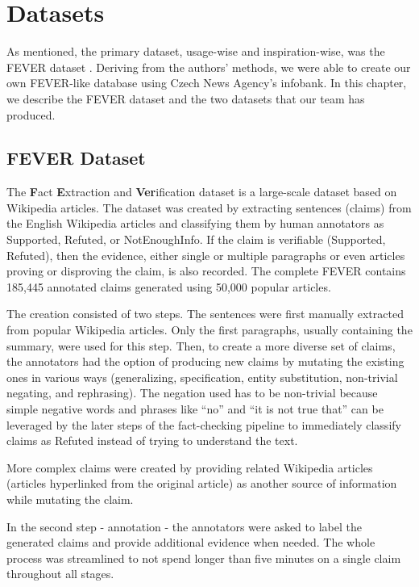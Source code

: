 \chapter{Datasets}
\label{chap:data}

As mentioned, the primary dataset, usage-wise and inspiration-wise, was the FEVER dataset \citep{fever}.
Deriving from the authors' methods, we \citep{ullrich} were able to create our own FEVER-like database using Czech News Agency's infobank. In this chapter, we describe the FEVER dataset and the two datasets that our team has produced.

\section{FEVER Dataset}

The \textbf{F}act \textbf{E}xtraction and \textbf{Ver}ification \citep{fever} dataset is a large-scale dataset based on Wikipedia articles.
The dataset was created by extracting sentences (claims) from the English Wikipedia articles and classifying them by human annotators as Supported, Refuted, or NotEnoughInfo.
If the claim is verifiable (Supported, Refuted), then the evidence, either single or multiple paragraphs or even articles proving or disproving the claim, is also recorded.
The complete FEVER contains 185,445 annotated claims generated using 50,000 popular articles.

The creation consisted of two steps. The sentences were first manually extracted from popular Wikipedia articles.
Only the first paragraphs, usually containing the summary, were used for this step. 
Then, to create a more diverse set of claims, the annotators had the option of producing new claims by mutating the existing ones in various ways (generalizing, specification, entity substitution, non-trivial negating, and rephrasing).
The negation used has to be non-trivial because simple negative words and phrases like ``no'' and ``it is not true that'' can be leveraged by the later steps of the fact-checking pipeline to immediately classify claims as Refuted instead of trying to understand the text.

More complex claims were created by providing related Wikipedia articles (articles hyperlinked from the original article) as another source of information while mutating the claim.

In the second step - annotation - the annotators were asked to label the generated claims and provide additional evidence when needed.
The whole process was streamlined to not spend longer than five minutes on a single claim throughout all stages.

